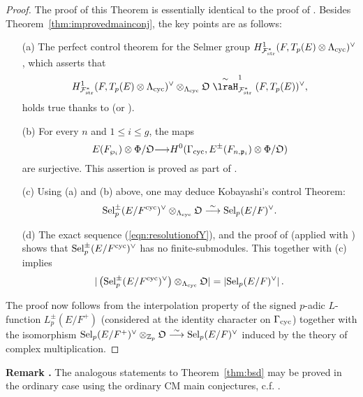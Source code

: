 \documentclass[12pt]{amsart}
\numberwithin{equation}{section}
\newenvironment{rem}{\par\medskip\noindent\refstepcounter{thm}
\bgroup{\hspace*{-0.15 cm}\bf{Remark} \thethm.}\bgroup}{\egroup
\egroup\par\medskip} \parskip 2pt
\begin{document}
\begin{proof}
The proof of this Theorem is essentially identical to the proof of \cite[Theorem 8.2]{pollackrubin}. Besides Theorem~\ref{thm:improvedmainconj}, the key points are as follows:
\begin{itemize}
\item[(a)] The perfect control theorem for the Selmer group $H^1_{{\mathcal{F}}^*_{\textup{str}}}(F,T_p(E)\otimes{\Lambda}_{\textup{cyc}})^{\vee}$, which asserts that
$$H^1_{{\mathcal{F}}^*_{\textup{str}}}(F,T_p(E)\otimes{\Lambda}_{\textup{cyc}})^{\vee}\otimes_{{\Lambda}_{\textup{cyc}}}{\frak{O}}\stackrel{\sim}\lraH^1_{{\mathcal{F}}^*_{\textup{str}}}(F,T_p(E))^{\vee},$$
holds true thanks to \cite[Lemma 3.5.3]{mr02} (or \cite[Proposition 8.10.1]{nekovar06}).
\item[(b)] For every $n$ and $1\leq i \leq g$, the maps
$$E(F_{\wp_i})\otimes \Phi/{\frak{O}} {\longrightarrow} H^0(\Gamma_{\textup{cyc}},E^\pm(F_{n,\frak{p}_i})\otimes \Phi/{\frak{O}})$$
are surjective. This assertion is proved as part of \cite[Lemma 8.3]{pollackrubin}.
\item[(c)] Using (a) and (b) above, one may deduce Kobayashi's control Theorem:
$$\textup{Sel}_p^\pm(E/F^{\textup{cyc}})^\vee\otimes_{{\Lambda}_{\textup{cyc}}} {\frak{O}} \stackrel{\sim}{\longrightarrow} \textup{Sel}_p(E/F)^\vee.$$
\item[(d)] The exact sequence (\ref{eqn:resolutionofY}), \cite[Lemma 6.5]{pollackrubin} and the proof of \cite[Theorem 11.16]{rubinmainconj} (applied with \cite[Theorem 3.1]{ng}) shows that $\textup{Sel}_p^\pm(E/F^{\textup{cyc}})^\vee$ has no finite-submodules. This together with (c) implies
$$|\left(\textup{Sel}_p^\pm(E/F^{\textup{cyc}})^\vee\right)\otimes_{{\Lambda}_{\textup{cyc}}} {\frak{O}}|=|\textup{Sel}_p(E/F)^\vee|\,.$$
\end{itemize}
The proof now follows from the interpolation property of the signed $p$-adic $L$-function $L_p^\pm(E/F^+)$ (considered at the identity character on $\Gamma_{\textup{cyc}}$) together with the isomorphism $\textup{Sel}_p(E/F^+)^\vee\otimes_{{\mathbb{Z}}_p}{\frak{O}}\stackrel{\sim}{\longrightarrow}\textup{Sel}_p(E/F)^\vee$
induced by the theory of complex multiplication.
\end{proof}
\begin{rem}
The analogous statements to Theorem~\ref{thm:bsd} may be proved in the ordinary case using the ordinary CM main conjectures, c.f. \cite{hsiehCMmainconj, kbbCMabvar}.
\end{rem}

{


}
\end{document}
